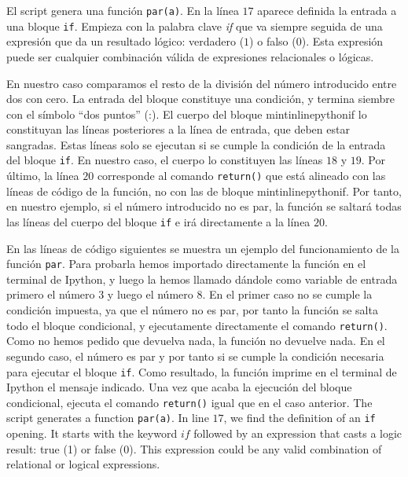 \begin{paracol}{2}
El script genera una función \texttt{par(a)}. En la línea $17$ aparece definida la entrada a una bloque \texttt{if}. Empieza con la palabra clave \emph{if} que va siempre seguida de una expresión que da un resultado lógico: verdadero ($1$) o falso ($0$). Esta expresión puede ser cualquier combinación válida de expresiones relacionales o lógicas.  

En nuestro caso comparamos el resto de la división del número introducido entre dos con cero. La entrada del bloque constituye una condición, y termina siembre con el símbolo ``dos puntos'' (:). El cuerpo del bloque mintinline{python}{if} lo constituyan las líneas posteriores a la línea de entrada, que deben estar sangradas. Estas líneas solo se ejecutan si se cumple la condición de la entrada del bloque \texttt{if}. En nuestro caso, el cuerpo lo constituyen las líneas $18$ y $19$. Por último, la línea $20$ corresponde al comando \texttt{return()} que está alineado con las líneas de código de la función, no con las de bloque mintinline{python}{if}. Por tanto, en nuestro ejemplo, si el número introducido no es par, la función se saltará todas las líneas del cuerpo del bloque \texttt{if} e irá directamente a la línea $20$.

En las líneas de código siguientes se muestra un ejemplo del funcionamiento de la función \texttt{par}. Para probarla hemos importado directamente la función en el terminal de Ipython, y luego la hemos llamado dándole como variable de entrada primero el  número $3$ y luego el número $8$. En el primer caso no se cumple la condición impuesta, ya que el número no es par, por tanto la función se salta todo el bloque condicional, y ejecutamente directamente el comando \texttt{return()}. Como no hemos pedido que devuelva nada, la función no devuelve nada. En el segundo caso, el número es par y por tanto si se cumple la condición necesaria para ejecutar el bloque \texttt{if}. Como resultado, la función imprime en el terminal de Ipython el mensaje indicado. Una vez que acaba la ejecución del bloque condicional, ejecuta el comando \texttt{return()} igual que en el caso anterior.
\switchcolumn
The script generates a function \texttt{par(a)}. In line $17$, we find the definition of an \texttt{if} opening. It starts with the keyword $if$ followed by an expression that casts a logic result: true (1) or false (0). This expression could be any valid combination of relational or logical expressions.


\end{paracol}
